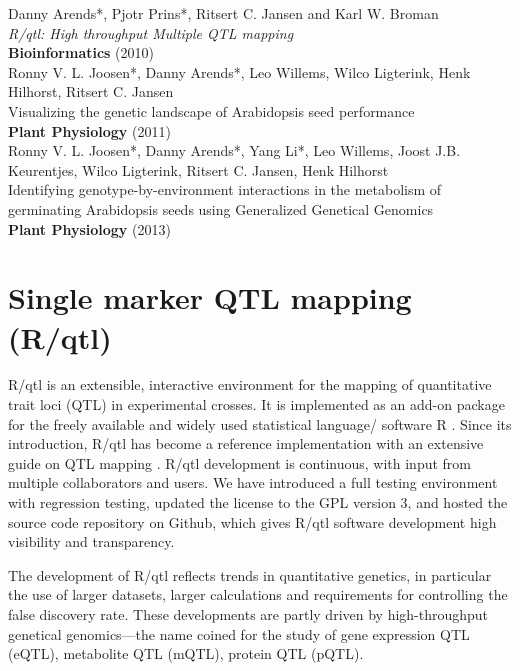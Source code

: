 \documentclass[8pt, twoside, a5paper]{report}
\newenvironment{myexampleblock}[1]{%
    \tcolorbox[beamer,%
    noparskip,breakable,
    colback=LightGreen,colframe=DarkGreen,%
    colbacklower=LimeGreen!75!LightGreen,%
    title=#1]}%
    {\endtcolorbox}
\newcommand{\authors}[1]{\small{#1}}
\newcommand{\bold}[1]{{\bfseries #1}}
\begin{document}
\begin{myexampleblock}{Originally published as:}
  \authors{Danny Arends*, Pjotr Prins*, Ritsert C. Jansen and Karl W. Broman}\\
  \emph{R/qtl: High throughput Multiple QTL mapping}\\
  \bold{Bioinformatics} (2010) \\

  \authors{Ronny V. L. Joosen*, Danny Arends*, Leo Willems, Wilco Ligterink, Henk Hilhorst, Ritsert C. Jansen}\\
  Visualizing the genetic landscape of Arabidopsis seed performance\\
  \bold{Plant Physiology} (2011)\\

  \authors{Ronny V. L. Joosen*, Danny Arends*, Yang Li*, Leo Willems, Joost J.B. Keurentjes, Wilco Ligterink, 
  Ritsert C. Jansen, Henk Hilhorst}\\
  Identifying genotype-by-environment interactions in the metabolism of germinating Arabidopsis seeds using 
  Generalized Genetical Genomics\\
  \bold{Plant Physiology} (2013)
\end{myexampleblock}

\newpage

\section{Single marker QTL mapping (R/qtl)}

R/qtl is an extensible, interactive environment for the mapping of quantitative trait loci (QTL) in experimental 
crosses. It is implemented as an add-on package for the freely available and widely used statistical language/
software R \cite{R:2009}. Since its introduction, R/qtl \cite{Broman:2003} has become a
reference implementation with an extensive guide on QTL mapping \cite{RQTLGuide:2009}. R/qtl development is 
continuous, with input from multiple collaborators and users.  We have introduced a full testing environment with 
regression testing, updated the license to the GPL version 3, and hosted the source code repository on Github,
which gives R/qtl software development high visibility and transparency. 

The development of R/qtl reflects trends in quantitative genetics, in particular the use of larger datasets, larger 
calculations and requirements for controlling the false discovery rate. These developments are partly driven by 
high-throughput genetical genomics---the name coined for the study of gene expression QTL (eQTL)\cite{Jansen:2001}, 
metabolite QTL (mQTL), protein QTL (pQTL).
\end{document}
